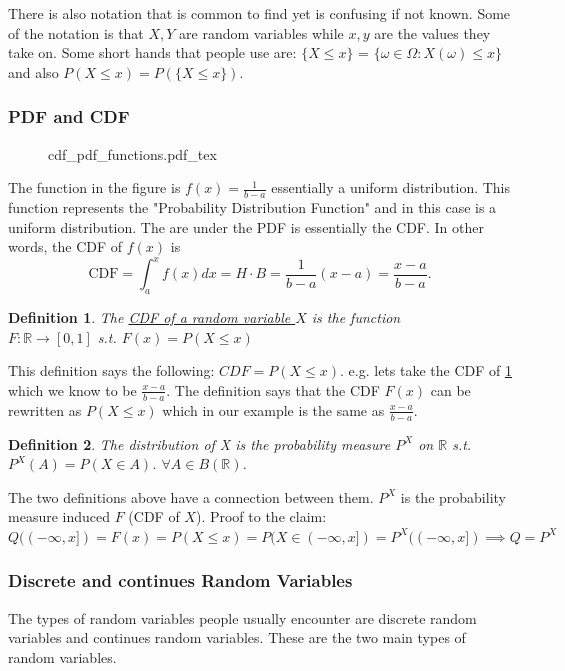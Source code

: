 \documentclass{article}
\newtheorem{definition}{Definition}
\newcommand{\incfig}[2]{
    \def\svgwidth{#2\columnwidth}
    {#1.pdf_tex}
}
\newcommand{\R}{ \mathbb{R} }
\begin{document}
There is also notation that is common to find yet is confusing if not known.
Some of the notation is that $X, Y$ are random variables while 
$x, y$ are the values they take on. Some short hands that people use are:
$\{ X \le x\} $ = $\{ \omega \in \Omega : X(\omega) \le x \}$ and also 
$P(X \le x) = P(\{X \le x\})$.

\subsubsection{PDF and CDF}
\begin{figure}[ht]
    \label{fig:pdf_cdf}
    \center
    \incfig{cdf_pdf_functions}{.4}
\end{figure}
The function in the figure is $f(x) = \frac{1}{b-a}$ essentially a uniform distribution.
This function represents the "Probability Distribution Function" and in this case is a 
uniform distribution. The are under the PDF is essentially the CDF. In other words, 
the CDF of $f(x)$ is 
\[
    \text{CDF} = \int_{a}^{x} f(x) dx = H \cdot B = \frac{1}{b-a}(x-a) = \frac{x-a}{b-a}
.\] 

\begin{definition}
    The \underline{CDF of a random variable $X$} is the function \\
    $F : \R \to [0, 1]$ s.t. $F(x) = P(X \le x)$
\end{definition}
This definition says the following: $CDF = P(X \le x)$. e.g. lets take the CDF 
of \ref{fig:pdf_cdf} which we know to be $\frac{x-a}{b-a}$. The definition says that 
the CDF $F(x)$ can be rewritten as $P(X \le x)$ which in our example is the same as  $\frac{x-a}{b-a}$.

\begin{definition}
    The distribution of X is the probability measure $P^X$ on $\R$ s.t.
    $P^X(A) = P(X \in A)$. $\forall A \in B(\R)$.
\end{definition}
The two definitions above have a connection between them.
$P^X$ is the probability measure induced $F$ (CDF of $X$).
Proof to the claim: $Q((-\infty, x]) = F(x) = P(X \le x) = P(X \in (-\infty, x]) = P^X((-\infty, x]) \implies Q=P^X$



\subsubsection{Discrete and continues Random Variables}
The types of random variables people usually encounter are discrete random variables 
and continues random variables. These are the two main types of random variables.
\end{document}
